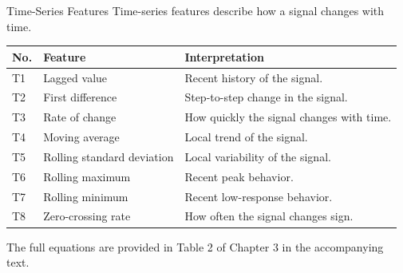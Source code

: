\documentclass[aspectratio=169]{beamer}
\begin{document}
\begin{frame}{Time-Series Features}
	Time-series features describe how a signal changes with time.
	
	\vspace{0.4em}
	
	\begin{table}
		\centering
		\scriptsize
		\begin{tabular}{p{} p{} p{}}
			\hline
			\textbf{No.} & \textbf{Feature} & \textbf{Interpretation} \\
			\hline
			T1 & Lagged value & Recent history of the signal. \\
			T2 & First difference & Step-to-step change in the signal. \\
			T3 & Rate of change & How quickly the signal changes with time. \\
			T4 & Moving average & Local trend of the signal. \\
			T5 & Rolling standard deviation & Local variability of the signal. \\
			T6 & Rolling maximum & Recent peak behavior. \\
			T7 & Rolling minimum & Recent low-response behavior. \\
			T8 & Zero-crossing rate & How often the signal changes sign. \\
			\hline
		\end{tabular}
	\end{table}
	
	\vspace{0.3em}
	
	{\scriptsize * The full equations are provided in Table 2 of Chapter 3 in the accompanying text.}
\end{frame}

\end{document}
